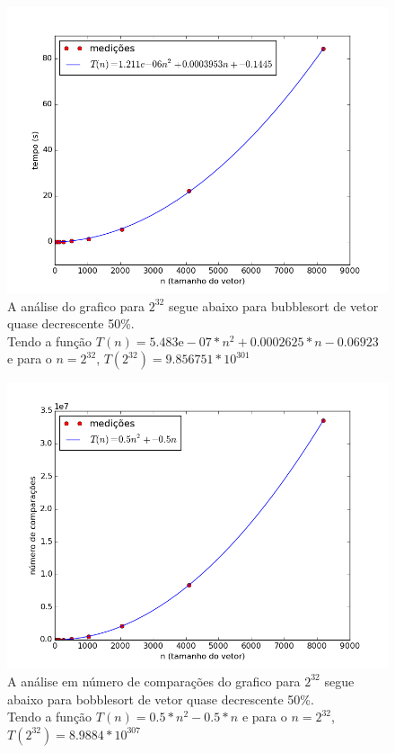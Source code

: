 \documentclass[12pt,a4paper,twoside]{report}
\begin{document}


\begin{figure}[ht]
\centering \includegraphics[scale=0.8]{../bolha/imagens/bolhaQuaseDecresc500.png}
\caption{A análise do grafico para $2^{32}$ segue abaixo para bubblesort de vetor quase decrescente 50\%.\\
Tendo a função $T(n) = 5.483\mathrm{e}-07*n^2+0.0002625*n-0.06923$ e para o $n =2^{32}$, $T(2^{32}) = 9.856751 * 10^{301}$}
\label{fig:bolhaQuaseCresc300}
\label{fig:bolhaQuaseDecresc500}
\end{figure}

\begin{figure}[ht]
\centering \includegraphics[scale=0.8]{../bolha/imagens/bolhaQuaseDecresc501.png}
\caption{A análise em número de comparações do grafico para $2^{32}$ segue abaixo para bobblesort de vetor quase decrescente 50\%.\\
Tendo a função $T(n) = 0.5*n^2 - 0.5*n$ e para o $n =2^{32}$, $T(2^{32}) = 8.9884 * 10^{307}$}
\label{fig:bolhaQuaseDecresc501}
\end{figure}
\end{document}

